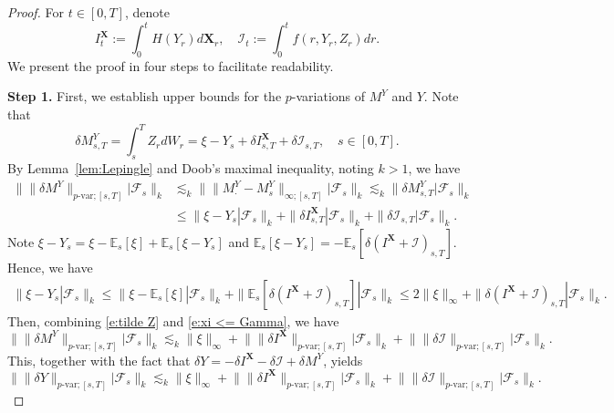 \documentclass[11pt,reqno]{amsart}
\numberwithin{equation}{section}
\def\E{\mathbb E}
\begin{document}
\begin{proof}
For $t\in[0,T]$, denote
\begin{equation}\label{e:def of Gamma}
I^{\mathbf X}_{t} := \int_{0}^{t}H(Y_{r})d\mathbf X_{r},\quad \mathcal I_{t} := \int_{0}^{t}f(r,Y_r,Z_r) dr.
\end{equation}
We present the proof in four steps to facilitate readability.


{\textbf{Step 1.}} 
First, we establish upper bounds for the $p$-variations of $M^{Y}$ and $Y$. Note that
\begin{equation*}
\delta M^{Y}_{s,T} = \int_{s}^{T}Z_{r} dW_r = \xi - Y_{s} + \delta I^{\mathbf X}_{s,T} + \delta \mathcal I_{s,T}, \quad s\in[0,T]. 
\end{equation*}
By Lemma~\ref{lem:Lepingle} and Doob's maximal inequality, noting $k > 1$, we have
\begin{equation}\label{e:tilde Z}
\begin{aligned}
\big\| \|\delta M^{Y}\|_{p\text{-var};[s,T]} \big|\mathcal F_{s} \big\|_{k} &\lesssim_{k} \big\| \| M^{Y}_{\bm\cdot} - M^Y_s \|_{\infty;[s,T]} \big|\mathcal F_{s} \big\|_{k} 
\lesssim_{k} \|  \delta M^{Y}_{s,T} |\mathcal F_{s} \|_{k}\\
& \le \|\xi - Y_{s} |\mathcal F_{s} \|_{k} + \| \delta I^{\mathbf X}_{s,T} | \mathcal F_{s}\|_{k}+ \|\delta \mathcal I_{s,T} | \mathcal F_{s} \|_{k}.
\end{aligned}
\end{equation}
Note $\xi - Y_{s} = \xi - \E_{s}[\xi] + \E_{s}[\xi - Y_s]$ and $\E_{s}[\xi - Y_s] = - \E_{s}[\delta (I^{\mathbf X} + \mathcal I)_{s,T}]$. Hence, we have
\begin{equation}\label{e:xi <= Gamma}
\begin{aligned}
\|\xi - Y_{s} |\mathcal F_{s} \|_{k} \le \|\xi - \E_{s}[\xi] |\mathcal F_{s} \|_{k} + \| \E_{s}[\delta (I^{\mathbf X} + \mathcal I)_{s,T}] |\mathcal F_{s}\|_{k}\le 2\|\xi\|_{\infty} + \| \delta (I^{\mathbf X} + \mathcal I)_{s,T} |\mathcal F_{s}\|_{k}.
\end{aligned}
\end{equation}
Then, combining \eqref{e:tilde Z} and \eqref{e:xi <= Gamma}, we have 
\begin{equation}\label{e:M^Y <= Gamma}
\big\| \|\delta M^{Y}\|_{p\text{-var};[s,T]} \big|\mathcal F_{s} \big\|_{k} \lesssim_{k} \|\xi\|_{\infty} + \big\| \|\delta I^{\mathbf X}\|_{p\text{-var};[s,T]} \big| \mathcal F_{s} \big\|_{k} + \big\| \|\delta \mathcal I\|_{p\text{-var};[s,T]} \big| \mathcal F_{s} \big\|_{k}.
\end{equation}
This, together with the fact that $\delta Y = -\delta I^{\mathbf X} - \delta \mathcal I + \delta M^Y$, yields
\begin{equation}\label{e:estim of Yn+1 (1)}
\big\| \|\delta Y\|_{p\text{-var};[s,T]} \big| \mathcal F_{s} \big\|_{k} 
\lesssim_{k} \|\xi\|_{\infty} + \big\| \|\delta I^{\mathbf X}\|_{p\text{-var};[s,T]} \big| \mathcal F_{s} \big\|_{k} + \big\|  \|\delta \mathcal I\|_{p\text{-var};[s,T]} \big| \mathcal F_{s} \big\|_{k}.
\end{equation}



\end{proof}
\end{document}
